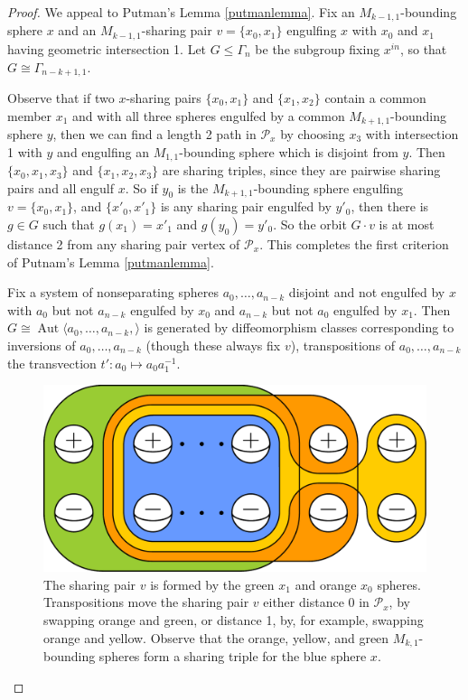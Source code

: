 \documentclass[11pt]{article}
\DeclareMathOperator{\aaut}{Aut}
\theoremstyle{remark}
\theoremstyle{definition}
\begin{document}
\begin{proof}
  We appeal to Putman's Lemma \ref{putmanlemma}.
  Fix an $M_{k-1,1}$-bounding sphere $x$ and
  an $M_{k-1,1}$-sharing pair $v=\{x_0,x_1\}$ engulfing $x$ with $x_0$ and $x_1$ having geometric intersection 1.
  Let $G \leq \Gamma_n$ be the subgroup fixing $x^{in}$, so that $G\cong \Gamma_{n-k+1,1}$.


  Observe that if two $x$-sharing pairs $\{x_0,x_1\}$ and $\{x_1,x_2\}$
  contain a common member $x_1$ and with all three spheres engulfed
  by a common $M_{k+1,1}$-bounding sphere $y$,
  then we can find a length 2 path in $\mathcal P_x$
  by choosing $x_3$ with intersection 1 with $y$
  and engulfing an $M_{1,1}$-bounding sphere which is disjoint from $y$.
  Then $\{x_0,x_1,x_3\}$ and $\{x_1,x_2,x_3\}$ are sharing triples, since
  they are pairwise sharing pairs and all engulf $x$.
  So if $y_0$ is the $M_{k+1,1}$-bounding sphere engulfing $v=\{x_0,x_1\}$,
  and
  $\{x'_0,x'_1\}$ is any sharing pair
  engulfed by $y'_0$,
  then there is $g \in G$ such that $g(x_1)= x'_1$ and $g(y_0) = y'_0$.
  So the orbit $G\cdot v$ is at most distance 2 from any sharing pair vertex of $\mathcal P_x$.
  This completes the first criterion of Putnam's Lemma \ref{putmanlemma}.


  Fix a system of nonseparating spheres
  $a_0, \ldots, a_{n-k}$ disjoint and not engulfed by $x$
  with $a_0$ but not $a_{n-k}$ engulfed by $x_0$ and $a_{n-k}$ but not $a_0$ engulfed by $x_1$.
  Then $G\cong \aaut \langle a_0,\ldots ,a_{n-k}, \rangle $
  is generated by diffeomorphism classes
  corresponding to
  inversions of $a_0, \ldots, a_{n-k}$ (though these always fix $v$),
  transpositions  of $a_0, \ldots, a_{n-k}$
  the transvection $t':a_0 \mapsto a_0a_1^{-1}$.

  \begin{figure}[b!]
    \centering
          \includegraphics[width=.7\textwidth]{figures/ksharepairgraph0.pdf}
          \caption{
          The sharing pair $v$ is formed by the  green $x_1$ and  orange $x_0$ spheres.
          Transpositions move the sharing pair $v$ either distance 0 in $\mathcal P_x$,
          by swapping orange and green, or
          distance 1, by, for example, swapping orange and yellow.
          Observe that the orange, yellow, and green $M_{k,1}$-bounding spheres form a sharing
          triple for the blue sphere $x$.}
          \label{fig:ksharepair0}
  \end{figure}




\end{proof}
\end{document}
